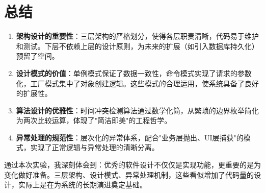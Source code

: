 \documentclass[a4paper]{article}
\begin{document}
\section{总结}
\begin{enumerate}
    \item \textbf{架构设计的重要性}：三层架构的严格划分，使得各层职责清晰，代码易于维护和测试。下层不依赖上层的设计原则，为未来的扩展（如引入数据库持久化）预留了空间。
    
    \item \textbf{设计模式的价值}：单例模式保证了数据一致性，命令模式实现了请求的参数化，工厂模式集中了对象创建逻辑。这些模式的合理运用，使系统具备了良好的扩展性。
    
    \item \textbf{算法设计的优雅性}：时间冲突检测算法通过数学化简，从繁琐的边界枚举简化为两次比较运算，体现了"简洁即美"的工程哲学。
    
    \item \textbf{异常处理的规范性}：层次化的异常体系，配合"业务层抛出、UI层捕获"的模式，实现了正常逻辑与异常处理的清晰分离。
\end{enumerate}
通过本次实验，我深刻体会到：优秀的软件设计不仅仅是实现功能，更重要的是为变化做好准备。三层架构、设计模式、异常处理机制，这些看似增加了代码量的设计，实际上是在为系统的长期演进奠定基础。
\end{document}
